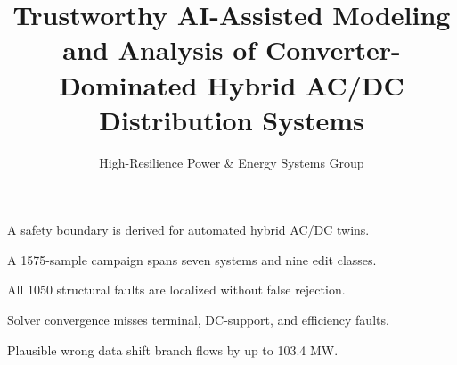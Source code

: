 \documentclass[preprint,12pt,a4paper]{elsarticle}
\begin{document}
\title{Trustworthy AI-Assisted Modeling and Analysis of
Converter-Dominated Hybrid AC/DC Distribution Systems}
\author{High-Resilience Power \& Energy Systems Group}

\begin{highlights}
\item A safety boundary is derived for automated hybrid AC/DC twins.
\item A 1575-sample campaign spans seven systems and nine edit classes.
\item All 1050 structural faults are localized without false rejection.
\item Solver convergence misses terminal, DC-support, and efficiency faults.
\item Plausible wrong data shift branch flows by up to 103.4 MW.
\end{highlights}
\end{document}
